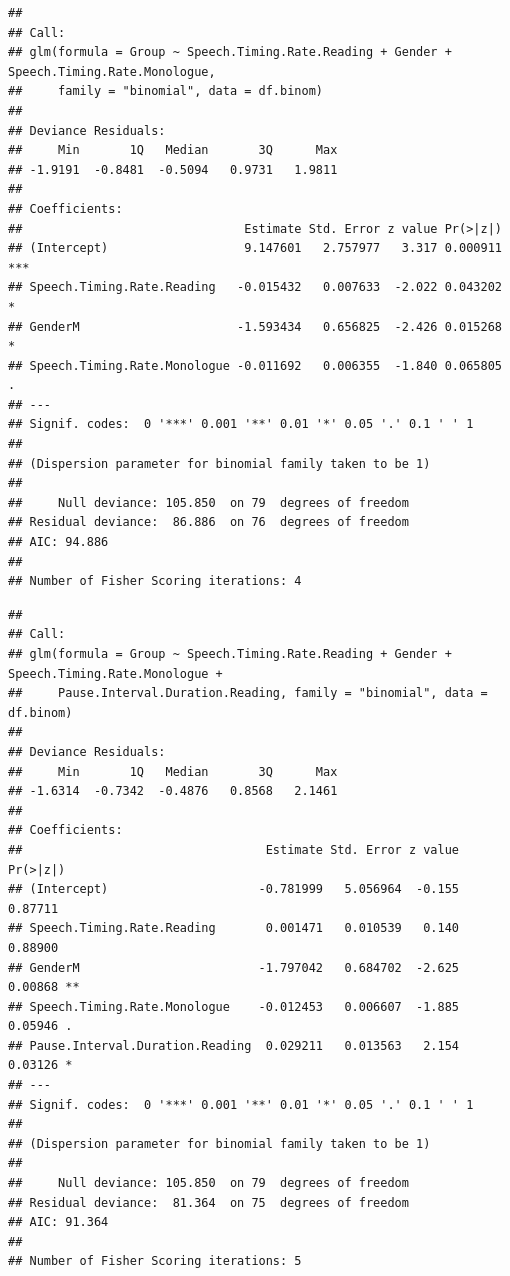 \documentclass[
  english,
  doc,floatsintext]{apa6}
\begin{document}
\begin{verbatim}
## 
## Call:
## glm(formula = Group ~ Speech.Timing.Rate.Reading + Gender + Speech.Timing.Rate.Monologue, 
##     family = "binomial", data = df.binom)
## 
## Deviance Residuals: 
##     Min       1Q   Median       3Q      Max  
## -1.9191  -0.8481  -0.5094   0.9731   1.9811  
## 
## Coefficients:
##                               Estimate Std. Error z value Pr(>|z|)    
## (Intercept)                   9.147601   2.757977   3.317 0.000911 ***
## Speech.Timing.Rate.Reading   -0.015432   0.007633  -2.022 0.043202 *  
## GenderM                      -1.593434   0.656825  -2.426 0.015268 *  
## Speech.Timing.Rate.Monologue -0.011692   0.006355  -1.840 0.065805 .  
## ---
## Signif. codes:  0 '***' 0.001 '**' 0.01 '*' 0.05 '.' 0.1 ' ' 1
## 
## (Dispersion parameter for binomial family taken to be 1)
## 
##     Null deviance: 105.850  on 79  degrees of freedom
## Residual deviance:  86.886  on 76  degrees of freedom
## AIC: 94.886
## 
## Number of Fisher Scoring iterations: 4
\end{verbatim}

\begin{verbatim}
## 
## Call:
## glm(formula = Group ~ Speech.Timing.Rate.Reading + Gender + Speech.Timing.Rate.Monologue + 
##     Pause.Interval.Duration.Reading, family = "binomial", data = df.binom)
## 
## Deviance Residuals: 
##     Min       1Q   Median       3Q      Max  
## -1.6314  -0.7342  -0.4876   0.8568   2.1461  
## 
## Coefficients:
##                                  Estimate Std. Error z value Pr(>|z|)   
## (Intercept)                     -0.781999   5.056964  -0.155  0.87711   
## Speech.Timing.Rate.Reading       0.001471   0.010539   0.140  0.88900   
## GenderM                         -1.797042   0.684702  -2.625  0.00868 **
## Speech.Timing.Rate.Monologue    -0.012453   0.006607  -1.885  0.05946 . 
## Pause.Interval.Duration.Reading  0.029211   0.013563   2.154  0.03126 * 
## ---
## Signif. codes:  0 '***' 0.001 '**' 0.01 '*' 0.05 '.' 0.1 ' ' 1
## 
## (Dispersion parameter for binomial family taken to be 1)
## 
##     Null deviance: 105.850  on 79  degrees of freedom
## Residual deviance:  81.364  on 75  degrees of freedom
## AIC: 91.364
## 
## Number of Fisher Scoring iterations: 5
\end{verbatim}
\end{document}
